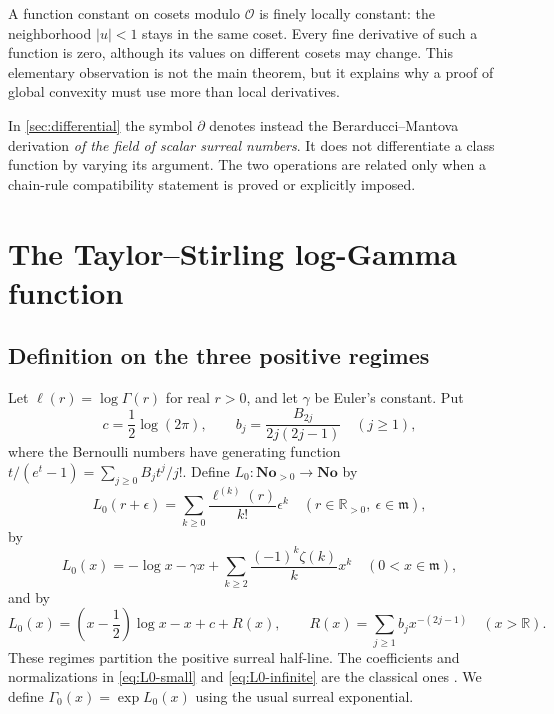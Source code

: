\documentclass[11pt,letterpaper]{article}
\numberwithin{equation}{section}
\theoremstyle{plain}
\theoremstyle{definition}
\theoremstyle{remark}
\newcommand{\No}{\mathbf{No}}
\newcommand{\R}{\mathbb R}
\newcommand{\Ocal}{\mathcal O}
\newcommand{\mi}{\mathfrak m}
\newcommand{\der}{\partial}
\newcommand{\abs}[1]{\lvert#1\rvert}
\begin{document}
A function constant on cosets modulo $\Ocal$ is finely locally constant:
the neighborhood $\abs{u}<1$ stays in the same coset. Every fine derivative
of such a function is zero, although its values on different cosets may
change. This elementary observation is not the main theorem, but it explains
why a proof of global convexity must use more than local derivatives.

In \cref{sec:differential} the symbol $\der$ denotes instead the
Berarducci--Mantova derivation \emph{of the field of scalar surreal numbers}.
It does not differentiate a class function by varying its argument. The two
operations are related only when a chain-rule compatibility statement is
proved or explicitly imposed.

\section{The Taylor--Stirling log-Gamma function}\label{sec:baseline}

\subsection{Definition on the three positive regimes}
Let $\ell(r)=\log\Gamma(r)$ for real $r>0$, and let $\gamma$ be Euler's
constant. Put
\begin{equation}\label{eq:coefficients}
 c=\frac12\log(2\pi),\qquad
 b_j=\frac{B_{2j}}{2j(2j-1)}\quad(j\ge1),
\end{equation}
where the Bernoulli numbers have generating function
$t/(e^t-1)=\sum_{j\ge0}B_jt^j/j!$.
Define $L_0:\No_{>0}\to\No$ by
\begin{equation}\label{eq:L0-finite}
 L_0(r+\epsilon)=\sum_{k\ge0}\frac{\ell^{(k)}(r)}{k!}\epsilon^k
 \quad(r\in\R_{>0},\ \epsilon\in\mi),
\end{equation}
by
\begin{equation}\label{eq:L0-small}
 L_0(x)=-\log x-\gamma x+
 \sum_{k\ge2}\frac{(-1)^k\zeta(k)}k x^k
 \quad(0<x\in\mi),
\end{equation}
and by
\begin{equation}\label{eq:L0-infinite}
 L_0(x)=\left(x-\frac12\right)\log x-x+c+R(x),
 \qquad
 R(x)=\sum_{j\ge1}b_jx^{-(2j-1)}
 \quad(x>\R).
\end{equation}
These regimes partition the positive surreal half-line. The coefficients and
normalizations in \eqref{eq:L0-small} and \eqref{eq:L0-infinite} are the
classical ones \cite[\S\S5.7,5.11]{DLMF57,DLMF511}. We define
$\Gamma_0(x)=\exp L_0(x)$ using the usual surreal exponential.
\end{document}
